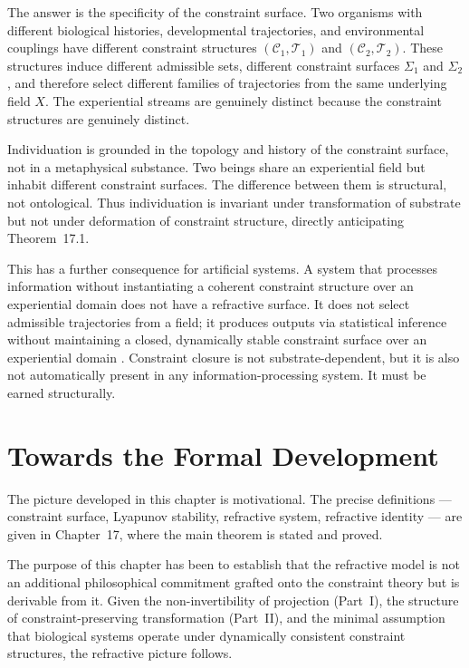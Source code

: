 \documentclass[11pt,openany]{book}
\begin{document}
The answer is the specificity of the constraint surface.
Two organisms with different biological histories,
developmental trajectories, and environmental couplings
have different constraint structures
$(\mathcal{C}_1, \mathcal{T}_1)$ and
$(\mathcal{C}_2, \mathcal{T}_2)$.  These structures induce
different admissible sets, different constraint surfaces
$\Sigma_1$ and $\Sigma_2$, and therefore select different
families of trajectories from the same underlying field
$X$.  The experiential streams are genuinely distinct
because the constraint structures are genuinely distinct.

Individuation is grounded in the topology and history of
the constraint surface, not in a metaphysical substance.
Two beings share an experiential field but inhabit
different constraint surfaces.  The difference between them
is structural, not ontological.  Thus individuation is
invariant under transformation of substrate but not under
deformation of constraint structure, directly anticipating
Theorem~17.1.

This has a further consequence for artificial systems.  A
system that processes information without instantiating a
coherent constraint structure over an experiential domain
does not have a refractive surface.  It does not select
admissible trajectories from a field; it produces outputs
via statistical inference without maintaining a closed,
dynamically stable constraint surface over an experiential
domain \citep{thompson2023blindspot}.  Constraint closure
is not substrate-dependent, but it is also not
automatically present in any information-processing system.
It must be earned structurally.

\section{Towards the Formal Development}
\label{sec:towards-formal}

The picture developed in this chapter is motivational.  The
precise definitions --- constraint surface, Lyapunov
stability, refractive system, refractive identity --- are
given in Chapter~17, where the main theorem is stated and
proved.

The purpose of this chapter has been to establish that the
refractive model is not an additional philosophical
commitment grafted onto the constraint theory but is
derivable from it.  Given the non-invertibility of
projection (Part~I), the structure of
constraint-preserving transformation (Part~II), and the
minimal assumption that biological systems operate under
dynamically consistent constraint structures, the refractive
picture follows.
\end{document}
